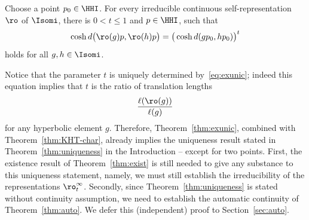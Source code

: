 \begin{theorem}\label{thm:exunic}
Choose a point $p_0\in \HHI$. For every irreducible continuous self-representation $\ro$ of $\Isomi$, there is $0<t\leq 1$ and $p\in \HHI$, such that
\begin{equation}\label{eq:exunic}
\cosh d\big(\ro(g) p, \ro(h) p\big) = \big(\cosh d(g p_0, h p_0)\big)^t
\end{equation}
holds for all $g,h\in \Isomi$.
\end{theorem}

Notice that the parameter $t$ is uniquely determined by~\eqref{eq:exunic}; indeed this equation implies that $t$ is the ratio of translation lengths
\[
\frac{\ell(\ro(g))}{\ell(g)}
\]
for any hyperbolic element $g$. Therefore, Theorem~\ref{thm:exunic}, combined with Theorem~\ref{thm:KHT-char}, already implies the uniqueness result stated in Theorem~\ref{thm:uniqueness} in the Introduction -- except for two points. First, the existence result of Theorem~\ref{thm:exist} is still needed to give any substance to this uniqueness statement, namely, we must still establish the irreducibility of the representations $\ro^\infty_t$. Secondly, since Theorem~\ref{thm:uniqueness} is stated without continuity assumption, we need to establish the automatic continuity of Theorem~\ref{thm:auto}. We defer this (independent) proof to Section~\ref{sec:auto}.

